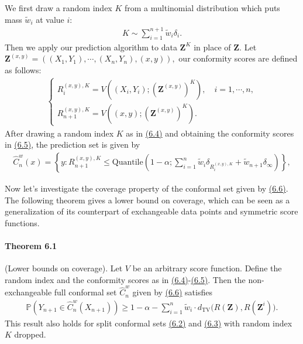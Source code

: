 \documentclass{article}
\numberwithin{equation}{section}
\begin{document}
We first draw a random index $K$ from a multinomial distribution which puts mass $\widetilde{w}_i$ at value $i$:
\begin{align*}
	K\sim\sum_{i=1}^{n+1}\widetilde{w}_i\delta_i.\tag{6.4}\label{6.4}
\end{align*}
Then we apply our prediction algorithm to data $\mathbf{Z}^K$ in place of $\mathbf{Z}.$ Let $\mathbf{Z}^{(x,y)} = \left((X_1,Y_1),\cdots,(X_n,Y_n),(x,y)\right),$ our conformity scores are defined as follows:
\begin{align*}
	\begin{cases}
		R_i^{(x,y),K} = V\left((X_i,Y_i);\left(\mathbf{Z}^{(x,y)}\right)^K\right),\quad i=1,\cdots,n,\\
		R_{n+1}^{(x,y),K} = V\left((x,y);\left(\mathbf{Z}^{(x,y)}\right)^K\right).
	\end{cases}\tag{6.5}\label{6.5}
\end{align*}
After drawing a random index $K$ as in \hyperref[6.4]{(6.4)} and obtaining the conformity scores in \hyperref[6.5]{(6.5)}, the prediction set is given by
\begin{align*}
	\widehat{C}_n^w(x) = \left\{y:R_{n+1}^{(x,y),K}\leq\mathrm{Quantile}\left(1-\alpha;\sum_{i=1}^n\widetilde{w}_i\delta_{R_i^{(x,y),K}} + \widetilde{w}_{n+1}\delta_\infty\right)\right\},\tag{6.6}\label{6.6}
\end{align*}


Now let's investigate the coverage property of the conformal set given by \hyperref[6.6]{(6.6)}. The following theorem gives a lower bound on coverage, which can be seen as a generalization of its counterpart of exchangeable data points and symmetric score functions.

\paragraph{Theorem 6.1\label{Theorem 6.1}} (Lower bounds on coverage). Let $V$ be an arbitrary score function. Define the random index and the conformity scores as in \hyperref[6.4]{(6.4)}-\hyperref[6.5]{(6.5)}. Then the non-exchangeable full conformal set $\widehat{C}_n^w$ given by \hyperref[6.6]{(6.6)} satisfies
\begin{align*}
	\mathbb{P}\left(Y_{n+1}\in\widehat{C}_n^w(X_{n+1})\right)\geq 1-\alpha - \sum_{i=1}^n\widetilde{w}_i\cdot d_\mathrm{TV}\bigl(R(\mathbf{Z}),R(\mathbf{Z}^i)\bigr).\tag{6.7}\label{6.7}
\end{align*}
This result also holds for split conformal sets \hyperref[6.2]{(6.2)} and \hyperref[6.3]{(6.3)} with random index $K$ dropped.
\end{document}
